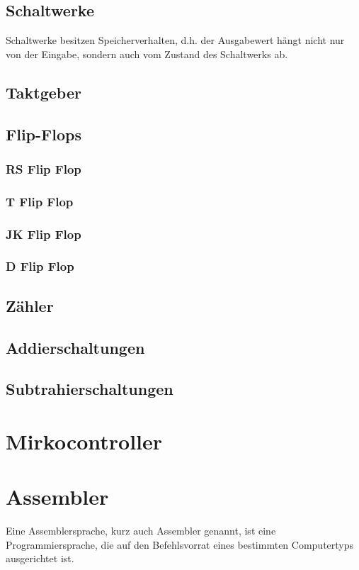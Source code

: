 \documentclass[12pt,a4paper]{article}
\begin{document}
\subsection{Schaltwerke}
Schaltwerke besitzen Speicherverhalten, d.h. der Ausgabewert hängt nicht nur von der Eingabe, sondern auch vom Zustand des Schaltwerks ab.
\subsection{Taktgeber}
\subsection{Flip-Flops}
\subsubsection{RS Flip Flop}
\subsubsection{T Flip Flop}
\subsubsection{JK Flip Flop}
\subsubsection{D Flip Flop}
\subsection{Zähler}
\subsection{Addierschaltungen}
\subsection{Subtrahierschaltungen}
\section{Mirkocontroller}
\section{Assembler}
Eine Assemblersprache, kurz auch Assembler genannt, ist eine Programmiersprache, die auf den Befehlsvorrat eines
bestimmten Computertyps ausgerichtet ist.
\end{document}
